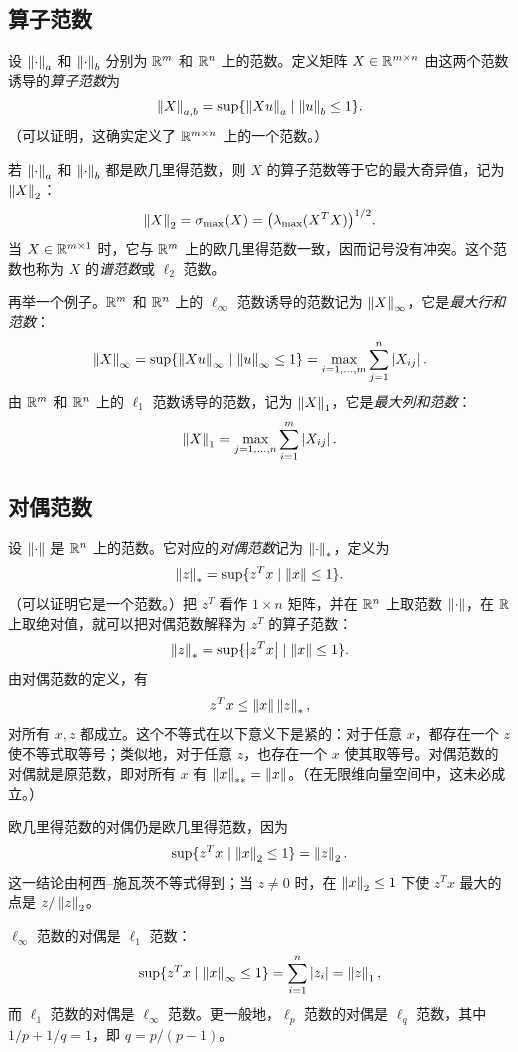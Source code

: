\subsection{算子范数}
设 $\left\lVert \cdot\right\rVert_a$ 和 $\left\lVert \cdot\right\rVert_b$ 分别为 $\mathbb R^m$ 和 $\mathbb R^n$ 上的范数。定义矩阵 $X\in\mathbb R^{m\times n}$ 由这两个范数诱导的\emph{算子范数}为
\[
 \left\lVert X\right\rVert_{a,b}=\sup\{\left\lVert Xu\right\rVert_a\mid\left\lVert u\right\rVert_b\leq1\}.
\]
（可以证明，这确实定义了 $\mathbb R^{m\times n}$ 上的一个范数。）

若 $\left\lVert \cdot\right\rVert_a$ 和 $\left\lVert \cdot\right\rVert_b$ 都是欧几里得范数，则 $X$ 的算子范数等于它的最大奇异值，记为 $\left\lVert X\right\rVert_2$：
\[
 \left\lVert X\right\rVert_2=\sigma_{\max}(X)=\bigl(\lambda_{\max}(X^TX)\bigr)^{1/2}.
\]
当 $X\in\mathbb R^{m\times1}$ 时，它与 $\mathbb R^m$ 上的欧几里得范数一致，因而记号没有冲突。这个范数也称为 $X$ 的\emph{谱范数}或 $\ell_2$ 范数。

再举一个例子。$\mathbb R^m$ 和 $\mathbb R^n$ 上的 $\ell_\infty$ 范数诱导的范数记为 $\left\lVert X\right\rVert_\infty$，它是\emph{最大行和范数}：
\[
 \left\lVert X\right\rVert_\infty=\sup\{\left\lVert Xu\right\rVert_\infty\mid\left\lVert u\right\rVert_\infty\leq1\}
 =\max_{i=1,\ldots,m}\sum_{j=1}^n\left\lvert X_{ij}\right\rvert.
\]
由 $\mathbb R^m$ 和 $\mathbb R^n$ 上的 $\ell_1$ 范数诱导的范数，记为 $\left\lVert X\right\rVert_1$，它是\emph{最大列和范数}：
\[
 \left\lVert X\right\rVert_1=\max_{j=1,\ldots,n}\sum_{i=1}^m\left\lvert X_{ij}\right\rvert.
\]

\subsection{对偶范数}
设 $\left\lVert \cdot\right\rVert$ 是 $\mathbb R^n$ 上的范数。它对应的\emph{对偶范数}记为 $\left\lVert \cdot\right\rVert_*$，定义为
\[
 \left\lVert z\right\rVert_*=\sup\{z^Tx\mid\left\lVert x\right\rVert\leq1\}.
\]
（可以证明它是一个范数。）把 $z^T$ 看作 $1\times n$ 矩阵，并在 $\mathbb R^n$ 上取范数 $\left\lVert \cdot\right\rVert$，在 $\mathbb R$ 上取绝对值，就可以把对偶范数解释为 $z^T$ 的算子范数：
\[
 \left\lVert z\right\rVert_*=\sup\{\left\lvert z^Tx\right\rvert\mid\left\lVert x\right\rVert\leq1\}.
\]
由对偶范数的定义，有
\[
 z^Tx\leq\left\lVert x\right\rVert\left\lVert z\right\rVert_*,
\]
对所有 $x,z$ 都成立。这个不等式在以下意义下是紧的：对于任意 $x$，都存在一个 $z$ 使不等式取等号；类似地，对于任意 $z$，也存在一个 $x$ 使其取等号。对偶范数的对偶就是原范数，即对所有 $x$ 有 $\left\lVert x\right\rVert_{**}=\left\lVert x\right\rVert$。（在无限维向量空间中，这未必成立。）

欧几里得范数的对偶仍是欧几里得范数，因为
\[
 \sup\{z^Tx\mid\left\lVert x\right\rVert_2\leq1\}=\left\lVert z\right\rVert_2.
\]
这一结论由柯西--施瓦茨不等式得到；当 $z\neq0$ 时，在 $\left\lVert x\right\rVert_2\leq1$ 下使 $z^Tx$ 最大的点是 $z/\left\lVert z\right\rVert_2$。

$\ell_\infty$ 范数的对偶是 $\ell_1$ 范数：
\[
 \sup\{z^Tx\mid\left\lVert x\right\rVert_\infty\leq1\}=\sum_{i=1}^n\left\lvert z_i\right\rvert=\left\lVert z\right\rVert_1,
\]
而 $\ell_1$ 范数的对偶是 $\ell_\infty$ 范数。更一般地，$\ell_p$ 范数的对偶是 $\ell_q$ 范数，其中 $1/p+1/q=1$，即 $q=p/(p-1)$。

